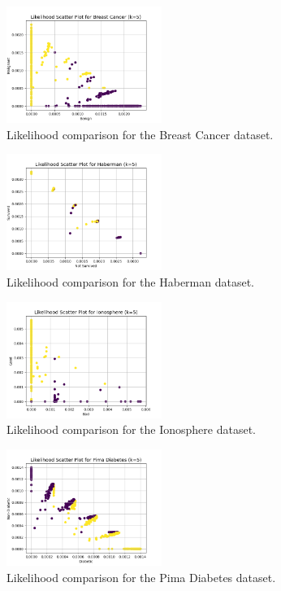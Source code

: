 \documentclass[conference]{IEEEtran}
\begin{document}
\begin{figure}[H]
    \centering
    \includegraphics[width=0.45\textwidth]{../scripts/comparison_results/Breast Cancer_likelihood.png}
    \caption{Likelihood comparison for the Breast Cancer dataset.}
    \label{fig:breast_cancer_likelihood}
\end{figure}

\begin{figure}[H]
    \centering
    \includegraphics[width=0.45\textwidth]{../scripts/comparison_results/Haberman_likelihood.png}
    \caption{Likelihood comparison for the Haberman dataset.}
    \label{fig:haberman_likelihood}
\end{figure}

\begin{figure}[H]
    \centering
    \includegraphics[width=0.45\textwidth]{../scripts/comparison_results/Ionosphere_likelihood.png}
    \caption{Likelihood comparison for the Ionosphere dataset.}
    \label{fig:ionosphere_likelihood}
\end{figure}

\begin{figure}[H]
    \centering
    \includegraphics[width=0.45\textwidth]{../scripts/comparison_results/Pima Diabetes_likelihood.png}
    \caption{Likelihood comparison for the Pima Diabetes dataset.}
    \label{fig:pima_diabetes_likelihood}
\end{figure}
\end{document}
